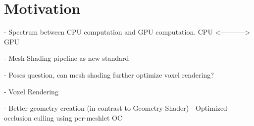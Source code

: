 \chapter{Motivation} \label{cpt-motivation}










- Spectrum between CPU computation and GPU computation. 
CPU <-----------> GPU

- Mesh-Shading pipeline as new standard 

- Poses question, can mesh shading further optimize voxel rendering?

- Voxel Rendering

- Better geometry creation (in contrast to Geometry Shader)
- Optimized occlusion culling using per-meshlet OC
